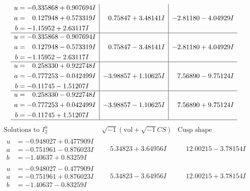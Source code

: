 \documentclass[1p]{elsarticle_modified}
\theoremstyle{definition}
\newcommand{\I}{\sqrt{-1}}
\begin{document}
$$\begin{array}{c|c|c}
\begin{aligned}
u &= -0.335868 + 0.907694 I \\
a &= \phantom{-}0.127948 + 0.573319 I \\
b &= -1.15952 + 2.63117 I\end{aligned}
 & \phantom{-}0.75847 + 3.48141 I & -2.81180 - 4.04929 I \\ \hline\begin{aligned}
u &= -0.335868 - 0.907694 I \\
a &= \phantom{-}0.127948 - 0.573319 I \\
b &= -1.15952 - 2.63117 I\end{aligned}
 & \phantom{-}0.75847 - 3.48141 I & -2.81180 + 4.04929 I \\ \hline\begin{aligned}
u &= \phantom{-}0.258330 + 0.922748 I \\
a &= -0.777253 - 0.042499 I \\
b &= -0.11745 - 1.51207 I\end{aligned}
 & -3.98857 + 1.10625 I & \phantom{-}7.56890 - 9.75124 I \\ \hline\begin{aligned}
u &= \phantom{-}0.258330 - 0.922748 I \\
a &= -0.777253 + 0.042499 I \\
b &= -0.11745 + 1.51207 I\end{aligned}
 & -3.98857 - 1.10625 I & \phantom{-}7.56890 + 9.75124 I\\
 \hline 
 \end{array}$$\newpage$$\begin{array}{c|c|c}  
\text{Solutions to }I^u_{2}& \I (\text{vol} + \sqrt{-1}CS) & \text{Cusp shape}\\
 \hline 
\begin{aligned}
u &= -0.948027 + 0.477909 I \\
a &= -0.751961 - 0.876023 I \\
b &= -1.40637 + 0.83259 I\end{aligned}
 & \phantom{-}5.34823 + 3.64956 I & \phantom{-}12.00215 - 3.78154 I \\ \hline\begin{aligned}
u &= -0.948027 - 0.477909 I \\
a &= -0.751961 + 0.876023 I \\
b &= -1.40637 - 0.83259 I\end{aligned}
 & \phantom{-}5.34823 - 3.64956 I & \phantom{-}12.00215 + 3.78154 I \\ \hline\begin{aligned}

\end{aligned}
\end{array}$$
\end{document}
